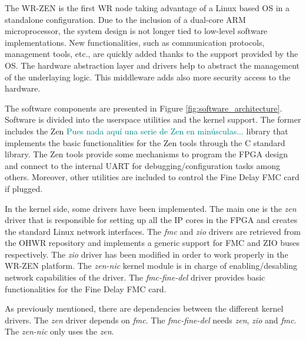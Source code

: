 The WR-ZEN is the first WR node taking advantage of a Linux based OS in a standalone configuration. 
Due to the inclusion of a dual-core ARM microprocessor, the system design is not longer tied to
low-level software implementations. New functionalities, such as communication
protocols, management tools, etc., are quickly added thanks to the support
provided by the OS. The hardware abstraction layer and drivers help to abstract
the management of the underlaying logic. This middleware adds also more
security access to the hardware.

The software components are presented in Figure
\ref{fig:software_architecture}.  Software is divided into the userspace utilities
and the kernel support.  The former includes the Zen \textcolor{teal}{Pues nada 
aquí una serie de Zen en minúsculas...} library that implements the
basic functionalities for the Zen tools through the C standard library. The Zen
tools provide some mechanisms to program the FPGA design and connect to the
internal UART for debugging/configuration tasks among others.  Moreover, other
utilities are included to control the Fine Delay FMC card if plugged.

In the kernel side, some drivers have been implemented. The main one is the
\textit{zen} driver that is responsible for setting up all the IP cores in the
FPGA and creates the standard Linux network interfaces. The \textit{fmc} and
\textit{zio} drivers are retrieved from the OHWR repository and implements a
generic support for FMC and ZIO buses respectively.  The \textit{zio} driver
has been modified in order to work properly in the WR-ZEN platform.  The
\textit{zen-nic} kernel module is in charge of enabling/desabling network
capabilities of the  driver. The \textit{fmc-fine-del} driver
provides basic functionalities for the Fine Delay FMC card.

As previously mentioned, there are dependencies between the different kernel
drivers. The \textit{zen} driver depends
on \textit{fmc}. The \textit{fmc-fine-del} needs \textit{zen}, \textit{zio} and
\textit{fmc}. The \textit{zen-nic} only uses the \textit{zen}.

